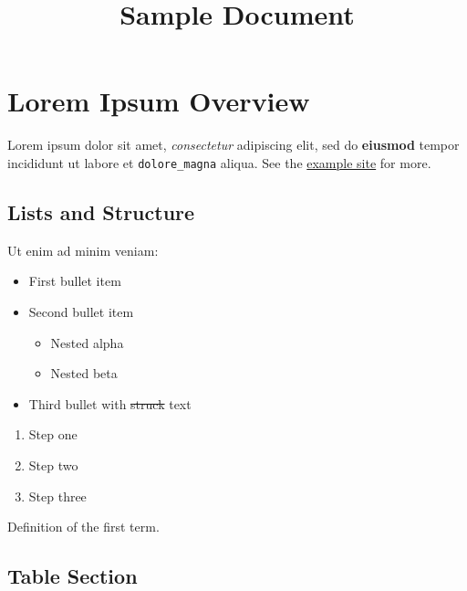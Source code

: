\documentclass[
  english,
]{article}
\title{Sample Document}
\author{}
\date{}
\providecommand{\tightlist}{%
  \setlength{\itemsep}{0pt}\setlength{\parskip}{0pt}}
\begin{document}
\maketitle

\section{Lorem Ipsum Overview}\label{lorem-ipsum-overview}

Lorem ipsum dolor sit amet, \emph{consectetur} adipiscing elit, sed do
\textbf{eiusmod} tempor incididunt ut labore et \texttt{dolore\_magna}
aliqua. See the \href{https://example.com/docs}{example site} for more.

\subsection{Lists and Structure}\label{lists-and-structure}

Ut enim ad minim veniam:

\begin{itemize}
\tightlist
\item
  First bullet item
\item
  Second bullet item

  \begin{itemize}
  \tightlist
  \item
    Nested alpha
  \item
    Nested beta
  \end{itemize}
\item
  Third bullet with \st{struck} text
\end{itemize}

\begin{enumerate}
\def\labelenumi{\arabic{enumi}.}
\tightlist
\item
  Step one
\item
  Step two
\item
  Step three
\end{enumerate}

\begin{description}
\tightlist
\item[Term One]
Definition of the first term.
\end{description}

\subsection{Table Section}\label{table-section}
\end{document}
